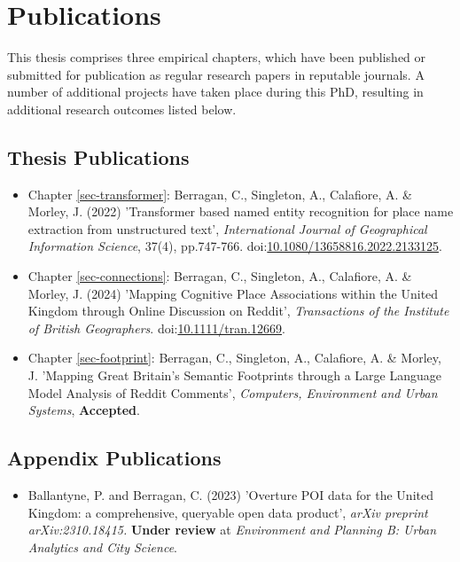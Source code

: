 \chapter{Publications}

This thesis comprises three empirical chapters, which have been published or submitted for publication as regular research papers in reputable journals. A number of additional projects have taken place during this PhD, resulting in additional research outcomes listed below.

\section*{Thesis Publications}

\begin{itemize}

  \item Chapter \ref{sec-transformer}: Berragan, C., Singleton, A., Calafiore, A. \& Morley, J. (2022) 'Transformer based named entity recognition for place name extraction from unstructured text', \textit{International Journal of Geographical Information Science}, 37(4), pp.747-766. doi:\href{https://doi.org/10.1080/13658816.2022.2133125}{10.1080/13658816.2022.2133125}.

  \item Chapter \ref{sec-connections}: Berragan, C., Singleton, A., Calafiore, A. \& Morley, J. (2024) 'Mapping Cognitive Place Associations within the United Kingdom through Online Discussion on Reddit', \textit{Transactions of the Institute of British Geographers}. doi:\href{https://doi.org/10.1111/tran.12669}{10.1111/tran.12669}.

  \item Chapter \ref{sec-footprint}: Berragan, C., Singleton, A., Calafiore, A. \& Morley, J. 'Mapping Great Britain's Semantic Footprints through a Large Language Model Analysis of Reddit Comments', \textit{Computers, Environment and Urban Systems}, \textbf{Accepted}.

\end{itemize}

\section*{Appendix Publications}

\begin{itemize}
  \item Ballantyne, P. and Berragan, C. (2023) 'Overture POI data for the United Kingdom: a comprehensive, queryable open data product', \textit{arXiv preprint arXiv:2310.18415.} \textbf{Under review} at \textit{Environment and Planning B: Urban Analytics and City Science}.
\end{itemize}

